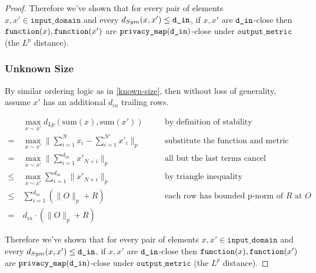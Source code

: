 \documentclass{article}
\begin{document}
\begin{proof}
    Therefore we've shown that for every pair of elements $x, x' \in \texttt{input\_domain}$ and every $d_{Sym}(x, x') \le \texttt{d\_in}$, 
    if $x, x'$ are $\texttt{d\_in}$-close then $\texttt{function}(x),\texttt{function}(x')$ are $\texttt{privacy\_map}(\texttt{d\_in})$-close under $\texttt{output\_metric}$ (the $L^p$ distance).

\subsubsection{Unknown Size}

    By similar ordering logic as in \ref{known-size},
    then without loss of generality, assume $x'$ has an additional $d_{in}$ trailing rows.

    \begin{align}
        & \ \max_{x \sim x'} d_{Lp}(\mathrm{sum}(x), \mathrm{sum}(x')) && \quad \text{by definition of stability}\\
        =&\ \max_{x \sim x'} \lVert\sum_{i = 1}^N x_i - \sum_{i = 1}^{N'} x'_i \rVert_p && \quad \text{substitute the function and metric} \\
        =&\ \max_{x \sim x'} \lVert\sum_{i = 1}^{d_{in}} x'_{N + i}\rVert_p && \quad\text{all but the last terms cancel} \\
        \le&\ \max_{x \sim x'} \sum_{i = 1}^{d_{in}} \lVert x'_{N + i} \rVert_p && \quad \text{by triangle inequality} \\
        \le&\ \sum_{i = 1}^{d_{in}} (\lVert O \rVert_p + R) && \quad\text{each row has bounded p-norm of } R \text{ at } O \\
        =&\ d_{in} \cdot (\lVert O \rVert_p + R)
    \end{align}
    
    Therefore we've shown that for every pair of elements $x, x' \in \texttt{input\_domain}$ and every $d_{Sym}(x, x') \le \texttt{d\_in}$, 
    if $x, x'$ are $\texttt{d\_in}$-close then $\texttt{function}(x),\texttt{function}(x')$ are $\texttt{privacy\_map}(\texttt{d\_in})$-close under $\texttt{output\_metric}$ (the $L^p$ distance).

\end{proof}
\end{document}
